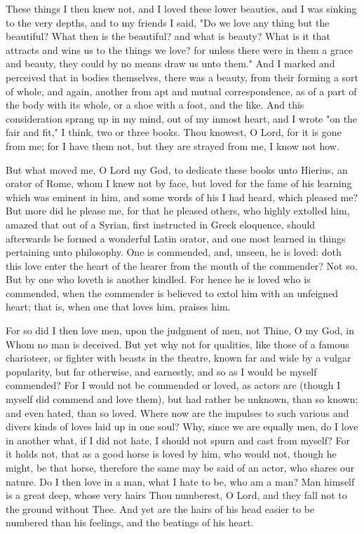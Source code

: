\documentclass[b5paper,openright,12pt,twoside]{book}
\begin{document}
These things I then knew not, and I loved these lower beauties, and I
was sinking to the very depths, and to my friends I said, "Do we love
any thing but the beautiful? What then is the beautiful? and what is
beauty? What is it that attracts and wins us to the things we love? for
unless there were in them a grace and beauty, they could by no
means draw us unto them." And I marked and perceived that in bodies
themselves, there was a beauty, from their forming a sort of whole, and
again, another from apt and mutual correspondence, as of a part of
the body with its whole, or a shoe with a foot, and the like. And this
consideration sprang up in my mind, out of my inmost heart, and I wrote
"on the fair and fit," I think, two or three books. Thou knowest, O
Lord, for it is gone from me; for I have them not, but they are strayed
from me, I know not how.

But what moved me, O Lord my God, to dedicate these books unto Hierius,
an orator of Rome, whom I knew not by face, but loved for the fame
of his learning which was eminent in him, and some words of his I had
heard, which pleased me? But more did he please me, for that he pleased
others, who highly extolled him, amazed that out of a Syrian, first
instructed in Greek eloquence, should afterwards be formed a wonderful
Latin orator, and one most learned in things pertaining unto philosophy.
One is commended, and, unseen, he is loved: doth this love enter the
heart of the hearer from the mouth of the commender? Not so. But by one
who loveth is another kindled. For hence he is loved who is commended,
when the commender is believed to extol him with an unfeigned heart;
that is, when one that loves him, praises him.

For so did I then love men, upon the judgment of men, not Thine, O my
God, in Whom no man is deceived. But yet why not for qualities, like
those of a famous charioteer, or fighter with beasts in the theatre,
known far and wide by a vulgar popularity, but far otherwise, and
earnestly, and so as I would be myself commended? For I would not be
commended or loved, as actors are (though I myself did commend and love
them), but had rather be unknown, than so known; and even hated, than
so loved. Where now are the impulses to such various and divers kinds of
loves laid up in one soul? Why, since we are equally men, do I love
in another what, if I did not hate, I should not spurn and cast from
myself? For it holds not, that as a good horse is loved by him, who
would not, though he might, be that horse, therefore the same may be
said of an actor, who shares our nature. Do I then love in a man, what I
hate to be, who am a man? Man himself is a great deep, whose very hairs
Thou numberest, O Lord, and they fall not to the ground without Thee.
And yet are the hairs of his head easier to be numbered than his
feelings, and the beatings of his heart.
\end{document}

